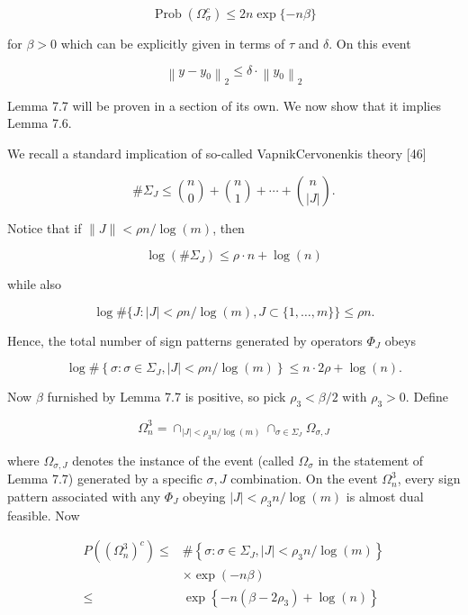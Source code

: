 \documentclass[10pt]{article}
\begin{document}
\begin{equation*}
\operatorname{Prob}\left(\Omega_{\sigma}^{c}\right) \leq 2 n \exp \{-n \beta\} \tag{VII.10}
\end{equation*}


for $\beta>0$ which can be explicitly given in terms of $\tau$ and $\delta$. On this event


\begin{equation*}
\left\|y-y_{0}\right\|_{2} \leq \delta \cdot\left\|y_{0}\right\|_{2} \tag{VII.11}
\end{equation*}


Lemma 7.7 will be proven in a section of its own. We now show that it implies Lemma 7.6.

We recall a standard implication of so-called VapnikCervonenkis theory [46]

$$
\# \Sigma_{J} \leq\binom{ n}{0}+\binom{n}{1}+\cdots+\binom{n}{|J|} .
$$

Notice that if $\|J\|<\rho n / \log (m)$, then

$$
\log \left(\# \Sigma_{J}\right) \leq \rho \cdot n+\log (n)
$$

while also

$$
\log \#\{J:|J|<\rho n / \log (m), J \subset\{1, \ldots, m\}\} \leq \rho n .
$$

Hence, the total number of sign patterns generated by operators $\Phi_{J}$ obeys

$$
\log \#\left\{\sigma: \sigma \in \Sigma_{J},|J|<\rho n / \log (m)\right\} \leq n \cdot 2 \rho+\log (n) .
$$

Now $\beta$ furnished by Lemma 7.7 is positive, so pick $\rho_{3}<\beta / 2$ with $\rho_{3}>0$. Define

$$
\Omega_{n}^{3}=\cap_{|J|<\rho_{3} n / \log (m)} \cap_{\sigma \in \Sigma_{J}} \Omega_{\sigma, J}
$$

where $\Omega_{\sigma, J}$ denotes the instance of the event (called $\Omega_{\sigma}$ in the statement of Lemma 7.7) generated by a specific $\sigma, J$ combination. On the event $\Omega_{n}^{3}$, every sign pattern associated with any $\Phi_{J}$ obeying $|J|<\rho_{3} n / \log (m)$ is almost dual feasible. Now

$$
\begin{aligned}
P\left(\left(\Omega_{n}^{3}\right)^{c}\right) \leq & \#\left\{\sigma: \sigma \in \Sigma_{J},|J|<\rho_{3} n / \log (m)\right\} \\
& \times \exp (-n \beta) \\
\leq & \exp \left\{-n\left(\beta-2 \rho_{3}\right)+\log (n)\right\}
\end{aligned}
$$
\end{document}
